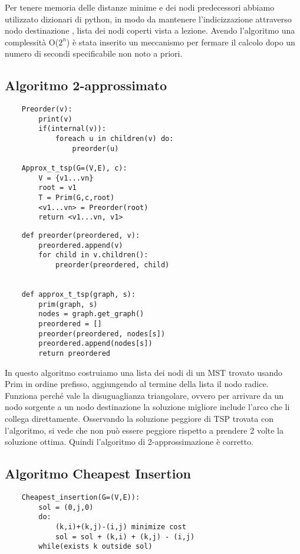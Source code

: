 Per tenere memoria delle distanze minime e dei nodi predecessori abbiamo utilizzato dizionari di python, in modo da mantenere l'indicizzazione attraverso nodo destinazione , lista dei nodi coperti vista a lezione.
Avendo l'algoritmo una complessità O(\(2^{n}\)) è stata inserito un meccanismo per fermare il calcolo dopo un numero di secondi specificabile non noto a priori.

\clearpage

\subsection{Algoritmo 2-approssimato\label{sec:a2a}}
\begin{verbatim}
    Preorder(v):
        print(v)
        if(internal(v)):
            foreach u in children(v) do:
                preorder(u)

    Approx_t_tsp(G=(V,E), c):
        V = {v1...vn}
        root = v1
        T = Prim(G,c,root)
        <v1...vn> = Preorder(root)
        return <v1...vn, v1>            
\end{verbatim}

\begin{verbatim}
    def preorder(preordered, v):
        preordered.append(v)
        for child in v.children():
            preorder(preordered, child)


    def approx_t_tsp(graph, s):
        prim(graph, s)
        nodes = graph.get_graph()
        preordered = []
        preorder(preordered, nodes[s])
        preordered.append(nodes[s])
        return preordered
\end{verbatim}

In questo algoritmo costruiamo una lista dei nodi di un MST trovato usando Prim in ordine prefisso, aggiungendo al termine della lista il nodo radice.
Funziona perché vale la disuguaglianza triangolare, ovvero per arrivare da un nodo sorgente a un nodo destinazione la soluzione migliore include l'arco che li collega direttamente.
Osservando la soluzione peggiore di TSP trovata con l'algoritmo, si vede che non può essere peggiore rispetto a prendere 2 volte la soluzione ottima.
Quindi l'algoritmo di 2-approssimazione è corretto.

\clearpage

\subsection{Algoritmo Cheapest Insertion\label{sec:ci}}
\begin{verbatim}
    Cheapest_insertion(G=(V,E)):
        sol = (0,j,0)
        do:
            (k,i)+(k,j)-(i,j) minimize cost
            sol = sol + (k,i) + (k,j) - (i,j)
        while(exists k outside sol)    

\end{verbatim}

